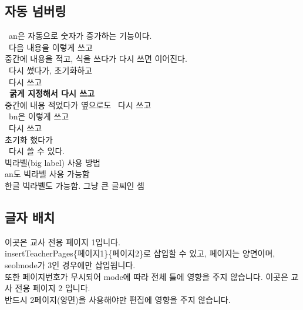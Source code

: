 \subsection{자동 넘버링}
%
\an\ an은 자동으로 숫자가 증가하는 기능이다. \\
\an\ 다음 내용을 이렇게 쓰고 \\
중간에 내용을 적고, 식을 쓰다가 다시 쓰면 이어진다. \\
\an\ 다시 썼다가, 초기화하고 \\
\anset
\an\ 다시 쓰고 \\
\textbf{\an\ 굵게 지정해서 다시 쓰고} \\
중간에 내용 적었다가 옆으로도 \an\ 다시 쓰고 \\
\bn\ bn은 이렇게 쓰고 \\
\bn\ 다시 쓰고 \\
\bnset
초기화 했다가 \\
\bn\ 다시 쓸 수 있다. \\
 빅라벨(big label) 사용 방법 \\
\biglabel{\an} an도 빅라벨 사용 가능함 \\
 한글 빅라벨도 가능함. 그냥 큰 글씨인 셈 \\

\subsection{글자 배치}
%

\clearpage

\insertTeacherPages %
{ %
이곳은 교사 전용 페이지 1입니다. \\
insertTeacherPages\{페이지1\}\{페이지2\}로 삽입할 수 있고,
페이지는 양면이며, seolmode가 3인 경우에만 삽입됩니다. \\
또한 페이지번호가 무시되어 mode에 따라 전체 틀에 영향을 주지 않습니다.
} %
{ %
이곳은 교사 전용 페이지 2 입니다. \\
반드시 2페이지(양면)을 사용해야만 편집에 영향을 주지 않습니다.
} %


